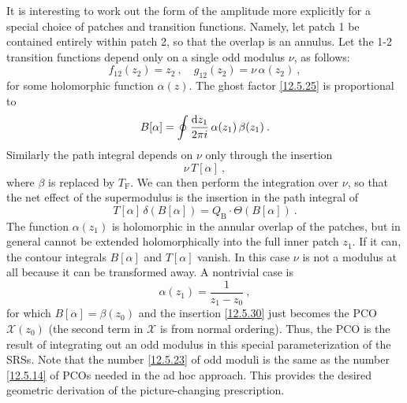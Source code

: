 It is interesting to work out the form of the amplitude more explicitly for a special choice of patches and transition functions. Namely, let patch 1 be contained entirely within patch 2, so that the overlap is an annulus. Let the 1-2 transition functions depend only on a single odd modulus $\nu$, as follows:
\begin{equation}
	f_{12}(z_2) = z_2 \:, \quad g_{12}(z_2) = \nu\,\alpha(z_2) \:, \label{12.5.27}
\end{equation}
for some holomorphic function $\alpha(z)$. The ghost factor \eqref{12.5.25} is proportional to
\begin{equation}
	B[\alpha] = \oint \frac{\mathrm{d} z_1}{2\pi i}\,\alpha(z_1)\,\beta(z_1) \:. \label{12.5.28}
\end{equation}
Similarly the path integral depends on $\nu$ only through the insertion
\begin{equation}
	\nu\,T[\alpha] \:, \label{12.5.29}
\end{equation}
where $\beta$ is replaced by $T_{\mathrm{F}}$. We can then perform the integration over $\nu$, so that the net effect of the supermodulus is the insertion in the path integral of
\begin{equation}
	T[\alpha]\,\delta(B[\alpha]) = Q_{\mathrm{B}}\cdot \Theta(B[\alpha]) \:. \label{12.5.30}
\end{equation}
The function $\alpha(z_1)$ is holomorphic in the annular overlap of the patches, but in general cannot be extended holomorphically into the full inner patch $z_1$. If it can, the contour integrals $B[\alpha]$ and $T[\alpha]$ vanish. In this case $\nu$ is not a modulus at all because it can be transformed away. A nontrivial case is
\begin{equation}
	\alpha(z_1) = \frac{1}{z_1 - z_0} \:, \label{12.5.31}
\end{equation}
for which $B[\alpha] = \beta(z_0)$ and the insertion \eqref{12.5.30} just becomes the PCO $\mathcal{X}(z_0)$ (the second term in $\mathcal{X}$ is from normal ordering). Thus, the PCO is the result of integrating out an odd modulus in this special parameterization of the SRSs. Note that the number \eqref{12.5.23} of odd moduli is the same as the number \eqref{12.5.14} of PCOs needed in the ad hoc approach. This provides the desired geometric derivation of the picture-changing prescription.

